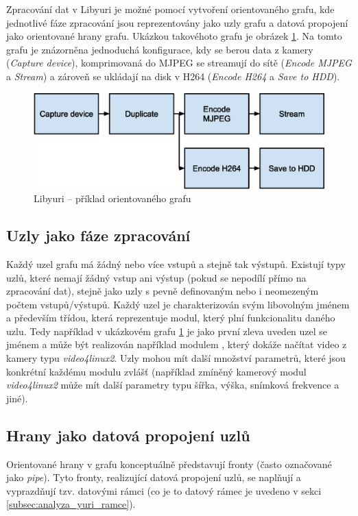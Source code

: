 \documentclass[thesis=M,czech]{FITthesis}[2012/06/26]
\begin{document}
Zpracování dat v Libyuri je možné pomocí vytvoření orientovaného grafu, kde jednotlivé fáze zpracování jsou reprezentovány jako uzly grafu a datová propojení jako orientované hrany grafu. Ukázkou takovéhoto grafu je obrázek \ref{img:yuri_example}.
Na tomto grafu je znázorněna jednoduchá konfigurace, kdy se berou data z kamery (\textit{Capture device}), komprimovaná do MJPEG  se streamují do sítě (\textit{Encode MJPEG} a \textit{Stream}) a zároveň se ukládají na disk v H264 (\textit{Encode H264} a \textit{Save to HDD}).
\\
\begin{figure}[h]\centering
	\includegraphics[width=1\textwidth]{images/yuri_example.eps}
	\caption{Libyuri -- příklad orientovaného grafu}\label{img:yuri_example}
\end{figure}

\subsection{Uzly jako fáze zpracování} \label{subsec:analyza_yuri_uzly}
Každý uzel grafu má žádný nebo více vstupů a stejně tak výstupů. Existují typy uzlů, které nemají žádný vstup ani výstup (pokud se nepodílí přímo na zpracování dat), stejně jako uzly s pevně definovaným nebo i neomezeným počtem vstupů/výstupů. Každý uzel je charakterizován svým libovolným jménem a především třídou, která reprezentuje modul, který plní funkcionalitu daného uzlu. Tedy například v ukázkovém grafu \ref{img:yuri_example} je jako první zleva uveden uzel se jménem  a může být realizován například modulem , který dokáže načítat video z kamery typu \textit{video4linux2}. Uzly mohou mít další množství parametrů, které jsou konkrétní každému modulu zvlášť (například zmíněný kamerový modul \textit{video4linux2} může mít další parametry typu šířka, výška, snímková frekvence a jiné).

\subsection{Hrany jako datová propojení uzlů} \label{subsec:analyza_yuri_hrany}
Orientované hrany v grafu konceptuálně představují fronty (často označované jako \textit{pipe}). Tyto fronty, realizující datová propojení uzlů, se naplňují a vyprazdňují tzv. datovými rámci (co je to datový rámec je uvedeno v sekci \ref{subsec:analyza_yuri_ramce}).
\end{document}
